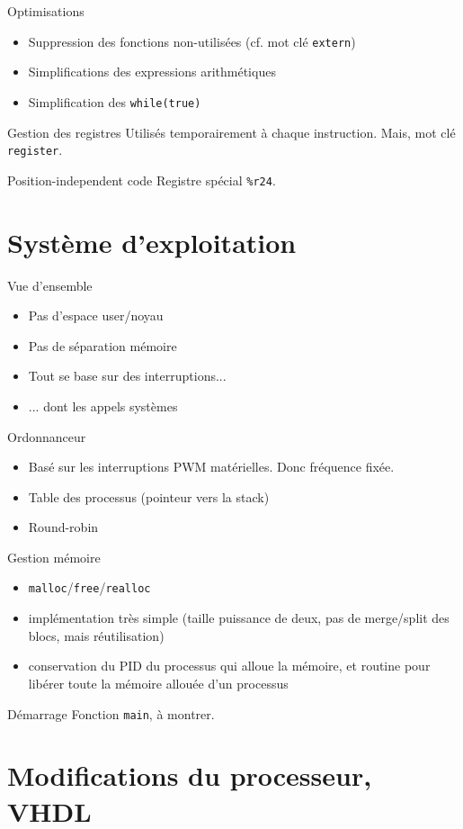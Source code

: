 \documentclass{beamer}
\begin{document}
  \begin{frame}[fragile]{Optimisations}
      \begin{itemize}
          \item Suppression des fonctions non-utilisées (cf. mot clé \verb+extern+)
          \item Simplifications des expressions arithmétiques
          \item Simplification des \verb+while(true)+
      \end{itemize}
\end{frame}

  \begin{frame}[fragile]{Gestion des registres}
      Utilisés temporairement à chaque instruction. Mais, mot clé \verb+register+.
\end{frame}

  \begin{frame}[fragile]{Position-independent code}
      Registre spécial \verb+%r24+.
\end{frame}

  \section{Système d'exploitation}

  \begin{frame}[fragile]{Vue d'ensemble}
    \begin{itemize}
      \item Pas d'espace user/noyau
      \item Pas de séparation mémoire
      \item Tout se base sur des interruptions...
      \item ... dont les appels systèmes
    \end{itemize}
\end{frame}

  \begin{frame}[fragile]{Ordonnanceur}
    \begin{itemize}
      \item Basé sur les interruptions PWM matérielles. Donc fréquence fixée.
      \item Table des processus (pointeur vers la stack)
      \item Round-robin
    \end{itemize}
\end{frame}

  \begin{frame}[fragile]{Gestion mémoire}
    \begin{itemize}
      \item \verb+malloc+/\verb+free+/\verb+realloc+
      \item implémentation très simple (taille puissance de deux, pas de merge/split des blocs, mais réutilisation)
      \item conservation du PID du processus qui alloue la mémoire, et routine pour libérer toute la mémoire allouée d'un processus
    \end{itemize}
\end{frame}

  \begin{frame}[fragile]{Démarrage}
      Fonction \verb+main+, à montrer.
\end{frame}

  \section{Modifications du processeur, VHDL}
\end{document}
